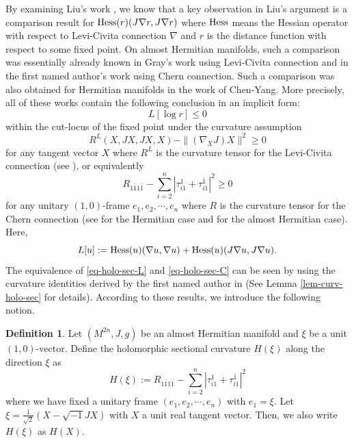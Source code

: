 \documentclass[12pt]{amsart}
\def\ii{{\sqrt{-1}}}
\theoremstyle{definition}
\newtheorem{defn}{Definition}[section]
\theoremstyle{remark}
\numberwithin{equation}{section}
\def\Hess{{\rm Hess}}
\begin{document}
By examining Liu's work \cite{Liu}, we know that a key observation in Liu's argument is a comparison result for $\Hess(r)(J\nabla r,J\nabla r)$ where $\Hess$ means the Hessian operator with respect to Levi-Civita connection $\nabla$ and $r$ is the distance function with respect to some fixed point. On almost Hermitian manifolds, such a comparison was essentially already known in Gray's work \cite{Gray} using Levi-Civita connection and in the first named author's work \cite{Yu2} using Chern connection. Such a comparison was also obtained for Hermitian manifolds in the work \cite{CY} of Chen-Yang. More precisely, all of these works contain the following conclusion in an implicit form:
\begin{equation}\label{eq-comparison}
L[\log r]\leq 0
\end{equation}
within the cut-locus of the fixed point under the curvature assumption
\begin{equation}\label{eq-holo-sec-L}
R^L(X,JX,JX,X)-\|(\nabla_X J)X\|^2\geq 0
\end{equation}
for any tangent vector $X$ where $R^L$ is the curvature tensor for the Levi-Civita connection (see \cite{Gray}), or equivalently
\begin{equation}\label{eq-holo-sec-C}
R_{1\bar 11\bar 1}-\sum_{i=2}^n|\tau_{i1}^1+\tau_{i1}^{\bar 1}|^2\geq 0
\end{equation}
for any unitary $(1,0)$-frame $e_1,e_2,\cdots,e_n$ where $R$ is the curvature tensor for the Chern connection (see \cite{CY} for the Hermitian case and \cite{Yu2} for the almost Hermitian case). Here,
\begin{equation}
L[u]:=\Hess(u)(\nabla u,\nabla u)+\Hess(u)(J\nabla u,J\nabla u).
\end{equation}
The equivalence of \eqref{eq-holo-sec-L} and \eqref{eq-holo-sec-C} can be seen by using the curvature identities derived by the first named author in \cite{Yu1} (See Lemma \ref{lem-curv-holo-sec} for details).  According to these results, we introduce the following notion.
\begin{defn}\label{def-holo-sec}
Let $(M^{2n},J,g)$ be an almost Hermitian manifold and $\xi$ be a unit $(1,0)$-vector. Define the holomorphic sectional curvature $H(\xi)$ along the direction $\xi$ as
\begin{equation}
H(\xi):=R_{1\bar 11\bar 1}-\sum_{i=2}^n|\tau_{i1}^1+\tau_{i 1}^{\bar 1}|^2
\end{equation}
where we have fixed a unitary frame $(e_1,e_2,\cdots,e_n)$ with $e_1=\xi$. Let $\xi=\frac{1}{\sqrt 2}(X-\ii JX)$ with $X$ a unit real tangent vector. Then, we also write $H(\xi)$ as $H(X)$.
\end{defn}
\end{document}
